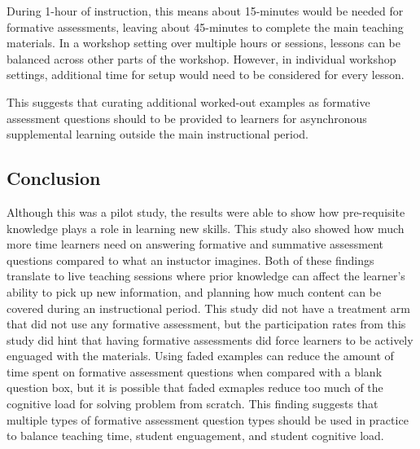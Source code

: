 \documentclass[040-assessment.tex]{subfiles}
\begin{document}
    During 1-hour of instruction, this means about 15-minutes would be needed for formative assessments,
    leaving about 45-minutes to complete the main teaching materials.
    In a workshop setting over multiple hours or sessions, lessons can be balanced across other parts of the workshop.
    However, in individual workshop settings, additional time for setup would need to be
    considered for every lesson.

    This suggests that curating additional worked-out examples as formative assessment questions
    should to be provided to learners
    for asynchronous supplemental learning outside the main instructional period.

\subsection{Conclusion}

    Although this was a pilot study, the results were able to show how pre-requisite knowledge plays a
    role in learning new skills.
    This study also showed how much more time learners need on answering formative and summative assessment questions compared to what an instuctor imagines.
    Both of these findings translate to live teaching sessions where prior knowledge can affect the learner's ability to pick up new information,
    and planning how much content can be covered during an instructional period.
    This study did not have a treatment arm that did not use any formative assessment,
    but the participation rates from this study did hint that having formative assessments did force learners to be actively enguaged with
    the materials.
    Using faded examples can reduce the amount of time spent on formative assessment questions when compared with a blank question box,
    but it is possible that faded exmaples reduce too much of the cognitive load for solving problem from scratch.
    This finding suggests that multiple types of formative assessment question types should be used in practice to balance
    teaching time, student enguagement, and student cognitive load.
\end{document}
